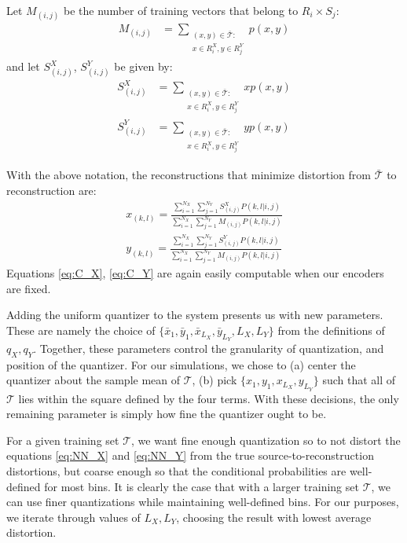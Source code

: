 Let $M_{(i,j)}$ be the number of training vectors that belong to $R_i\times S_j$:
\begin{align}
    M_{(i,j)} &=
    \sum_{\substack{(x,y)\in \mathcal{\bar T}:\\x\in R_i^X,y\in R_j^Y}}p(x,y)
\end{align}
and let $S_{(i,j)}^X$, $S_{(i,j)}^Y$ be given by:
\begin{align}
    S^X_{(i,j)} &=
    \sum_{\substack{(x,y)\in \mathcal{\bar T}:\\x\in R_i^X,y\in R_j^Y}}x p(x,y)\\
    S^Y_{(i,j)} &=
    \sum_{\substack{(x,y)\in \mathcal{\bar T}:\\x\in R_i^X,y\in R_j^Y}}y p(x,y)
\end{align}

With the above notation, the reconstructions that minimize distortion from $\mathcal{\bar T}$ to reconstruction are:
\begin{align}
    \label{eq:C_X}
    x_{(k,l)} = 
        \frac{\sum_{i=1}^{N_X} \sum_{j=1}^{N_Y}
        S_{(i,j)}^X P(k,l|i,j)}
        {\sum_{i=1}^{N_X} \sum_{j=1}^{N_Y}
        M_{(i,j)} P(k,l|i,j)}\\
    \label{eq:C_Y}
    y_{(k,l)} = 
        \frac{\sum_{i=1}^{N_X} \sum_{j=1}^{N_Y}
        S_{(i,j)}^Y P(k,l|i,j)}
        {\sum_{i=1}^{N_X} \sum_{j=1}^{N_Y}
        M_{(i,j)} P(k,l|i,j)}
\end{align}
Equations \eqref{eq:C_X}, \eqref{eq:C_Y} are again easily computable when our encoders are fixed.

Adding the uniform quantizer to the system presents us with new parameters. These are namely the choice of $\{\bar x_1, \bar y_1, \bar x_{L_X}, \bar y_{L_Y}, L_X, L_Y\}$ from the definitions of $q_X,q_Y$. Together, these parameters control the granularity of quantization, and position of the quantizer. For our simulations, we chose to (a) center the quantizer about the sample mean of $\mathcal T$, (b) pick $\{x_1, y_1, x_{L_X}, y_{L_Y}\}$ such that all of $\mathcal T$ lies within the square defined by the four terms. With these decisions, the only remaining parameter is simply how fine the quantizer ought to be.

For a given training set $\mathcal T$, we want fine enough quantization so to not distort the equations \eqref{eq:NN_X} and \eqref{eq:NN_Y} from the true source-to-reconstruction distortions, but coarse enough so that the conditional probabilities are well-defined for most bins. It is clearly the case that with a larger training set $\mathcal T$, we can use finer quantizations while maintaining well-defined bins. For our purposes, we iterate through values of $L_X, L_Y$, choosing the result with lowest average distortion.

